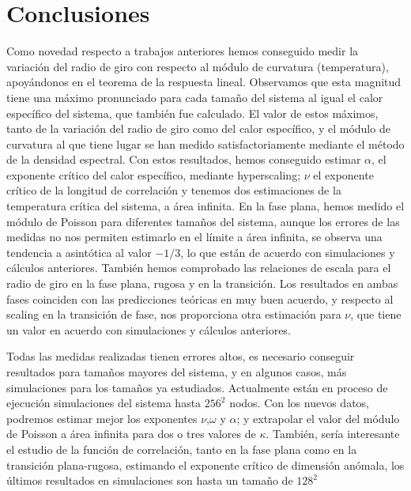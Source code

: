 \chapter{Conclusiones}

Como novedad respecto a trabajos anteriores hemos conseguido medir la
variación del radio de giro con respecto al módulo de curvatura (temperatura),
apoyándonos en el teorema de la respuesta lineal. Observamos que esta magnitud
tiene una máximo pronunciado para cada tamaño del sistema al igual el calor
específico del sistema, que también fue calculado. El valor de estos máximos, tanto de la
variación del radio de giro como del calor específico, y el módulo de
curvatura al que tiene lugar se han medido satisfactoriamente mediante el
método de la densidad espectral. Con estos resultados, hemos conseguido
estimar $\alpha$, el exponente crítico del calor específico, mediante
hyperscaling; $\nu$ el exponente crítico de la longitud de correlación y
tenemos dos estimaciones de la temperatura crítica del sistema, a área
infinita. En la fase plana, hemos medido el módulo de Poisson para diferentes
tamaños del sistema, aunque los errores de las medidas no nos permiten estimarlo
en el límite a área infinita, se observa una tendencia a asintótica al valor
$-1/3$, lo que están de acuerdo con simulaciones y cálculos anteriores.
También hemos comprobado las relaciones de escala para el radio de giro en la
fase plana, rugosa y en la transición. Los resultados en ambas fases coinciden
con las predicciones teóricas en muy buen acuerdo, y respecto al scaling en la
transición de fase, nos proporciona otra estimación para $\nu$, que tiene un
valor en acuerdo con simulaciones y cálculos anteriores.

Todas las medidas realizadas tienen errores altos, es necesario conseguir
resultados para tamaños mayores del sistema, y en algunos casos, más simulaciones para los
tamaños ya estudiados. Actualmente están en proceso de ejecución simulaciones
del sistema hasta $256^2$ nodos. Con los nuevos datos, podremos estimar mejor
los exponentes $\nu$,$\omega$ y $\alpha$; y extrapolar el valor del módulo de
Poisson a área infinita para dos o tres valores de $\kappa$. También, sería interesante
el estudio de la función de correlación, tanto en la fase plana como en la
transición plana-rugosa, estimando el exponente crítico de dimensión anómala,
los últimos resultados en simulaciones son hasta un tamaño de $128^2$
